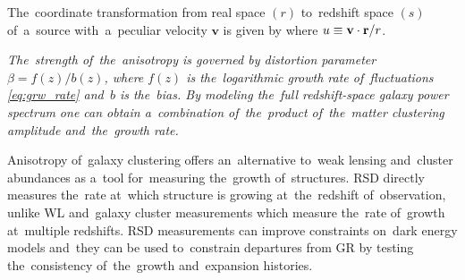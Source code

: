 The~coordinate transformation from real space $(r)$ to~redshift space $(s)$ of~a~source with~a~peculiar velocity $\bm v$ is given by \parencite{2010deto.book.....A}
where $u\equiv\mathbf v\cdot\mathbf r/r$. {\itshape The~strength of~the~anisotropy is governed by distortion parameter $\beta = f(z)/b(z)$, where $f(z)$ is the~logarithmic growth rate of~fluctuations \eqref{eq:grw_rate} and~$b$ is the~bias. By modeling the~full redshift-space galaxy power spectrum one can obtain a~combination of~the~product of~the~matter clustering amplitude and~the~growth rate.

Anisotropy of~galaxy clustering offers an~alternative to~weak lensing and~cluster abundances as a~tool for~measuring the~growth of~structures. RSD directly measures the~rate at~which structure is growing at~the~redshift of~observation, unlike WL and~galaxy cluster measurements which measure the~rate of~growth at~multiple redshifts. RSD measurements can improve constraints on~dark energy models and~they can be used to~constrain departures from GR by testing the~consistency of~the~growth and~expansion histories.
}
